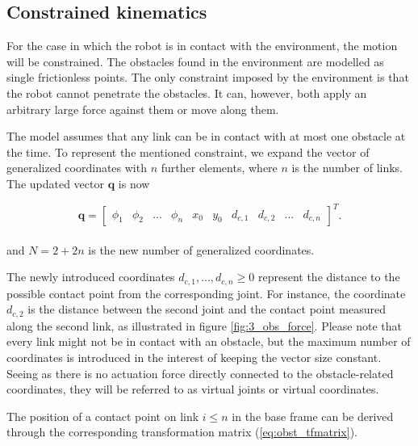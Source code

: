 
\subsection{Constrained kinematics}\label{seq:constr_kin}

For the case in which the robot is in contact with the environment, the motion will be constrained. The obstacles found in the environment are modelled as single frictionless points. The only constraint imposed by the environment is that the robot cannot penetrate the obstacles. It can, however, both apply an arbitrary large force against them or move along them.

The model assumes that any link can be in contact with at most one obstacle at the time. To represent the mentioned constraint, we expand the vector of generalized coordinates with $n$ further elements, where $n$ is the number of links. The updated vector $\mathbf{q}$ is now

\begin{equation} \label{eq:q2}
    \mathbf{q} = 
    \begin{bmatrix}
        \phi_1 & \phi_2 & ... & \phi_n & x_0 & y_0 & d_{c,1} & d_{c,2} & ... & d_{c,n}
    \end{bmatrix}^T.
\end{equation}
\\
and $N = 2 + 2n$ is the new number of generalized coordinates.

The newly introduced coordinates $d_{c,1}, ... , d_{c,n} \geq 0$ represent the distance to the possible contact point from the corresponding joint. For instance, the coordinate $d_{c,2}$ is the distance between the second joint and the contact point measured along the second link, as illustrated in figure \ref{fig:3_obs_force}. Please note that every link might not be in contact with an obstacle, but the maximum number of coordinates is introduced in the interest of keeping the vector size constant. 
Seeing as there is no actuation force directly connected to the obstacle-related coordinates, they will be referred to as virtual joints or virtual coordinates.

The position of a contact point on link $i\leq n$ in the base frame can be derived through the corresponding transformation matrix (\ref{eq:obst_tfmatrix}).

